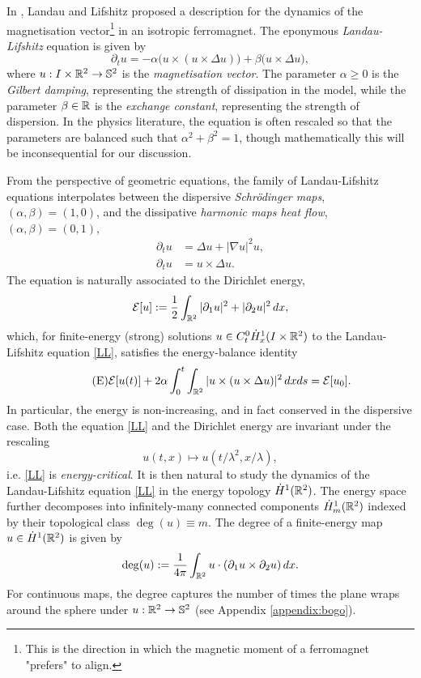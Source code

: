 
In \cite{Landau:1935qbc}, Landau and Lifshitz proposed a description for the dynamics of the magnetisation vector\footnote{This is the direction in which the magnetic moment of a ferromagnet "prefers" to align.} in an isotropic ferromagnet. The eponymous \textit{Landau-Lifshitz} equation is given by 
\begin{equation}\tag{LL}\label{eq:LL}
	\partial_t u
		= -\alpha \big( u \times (u \times \Delta u)\big) + \beta \big( u \times \Delta u  \big),
\end{equation}
where $u : I \times \mathbb R^2 \to \mathbb S^2$ is the \textit{magnetisation vector}. The parameter $\alpha \geq 0$ is the \textit{Gilbert damping}, representing the strength of dissipation in the model, while the parameter $\beta \in \mathbb R$ is the \textit{exchange constant}, representing the strength of dispersion. In the physics literature, the equation is often rescaled so that the parameters are balanced such that $\alpha^2 + \beta^2 = 1$, though mathematically this will be inconsequential for our discussion. 

From the perspective of geometric equations, the family of Landau-Lifshitz equations interpolates between the dispersive \textit{Schr\"odinger maps}, $(\alpha, \beta) = (1, 0)$, and the dissipative \textit{harmonic maps heat flow}, $(\alpha, \beta) = (0, 1)$, 
\begin{align}
	\partial_t u 
		&= \Delta u + |\nabla u|^2 u, 
		\tag{HMHF}\\
	\partial_t u 
		&= u\times \Delta u.
		\tag{SM}\label{eq:schrodinger}
\end{align}
The equation is naturally associated to the Dirichlet energy, 
	\[
		\mathcal E[u] 
			:= \frac12 \int_{\mathbb R^2} |\partial_1 u|^2 + |\partial_2 u|^2 \, dx,
	\]
which, for
finite-energy (strong) solutions $u \in C^0_t \dot H^1_x (I \times \mathbb R^2)$ to the Landau-Lifshitz equation \eqref{LL}, satisfies the energy-balance identity 
	\begin{equation}\tag{E}\label{eq:energy}
	\mathcal E[u(t)]
		+ 2 \alpha \int_0^t \int_{\mathbb R^2} |u \times (u \times \Delta u)|^2 \, dx ds = \mathcal E[u_0].
	\end{equation}
In particular, the energy is non-increasing, and in fact conserved in the dispersive case. Both the equation \eqref{LL} and the Dirichlet energy are invariant under the rescaling 
\[ 
	u(t, x) \mapsto u(t/\lambda^2, x/\lambda),
\] 
i.e. \eqref{LL} is \textit{energy-critical}. It is then natural to study the dynamics of the Landau-Lifshitz equation \eqref{LL} in the energy topology $\dot H^1 (\mathbb R^2)$. The energy space further decomposes into infinitely-many connected components $\dot H^1_m (\mathbb R^2)$ indexed by their topological class $\deg(u) \equiv m$. The degree of a finite-energy map $u \in \dot H^1 (\mathbb R^2)$ is given by 
	\[
		\deg(u) := \frac{1}{4\pi}\int_{\mathbb R^2} u \cdot (\partial_1 u \times \partial_2 u) \, dx.
	\]
For continuous maps, the degree captures the number of times the plane wraps around the sphere under $u : \mathbb R^2 \to \mathbb S^2$ (see Appendix \ref{appendix:bogo}).

